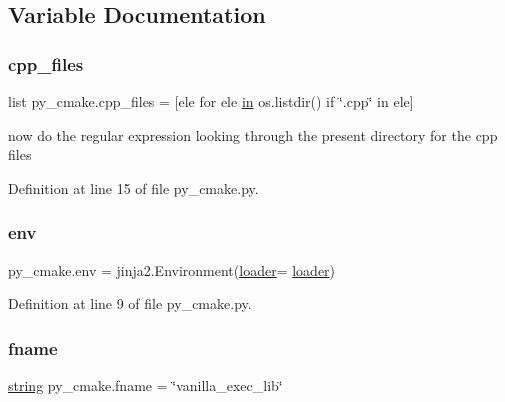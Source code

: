 \subsection{Variable Documentation}
\mbox{\label{namespacepy__cmake_a2adfb240dd9e470e11d95645a68c30e9}} 
\subsubsection{\texorpdfstring{cpp\+\_\+files}{cpp\_files}}
{\footnotesize\ttfamily list py\+\_\+cmake.\+cpp\+\_\+files = \mbox{[}ele for ele \mbox{\hyperlink{glad_8h_a83ad0ee7f1e06b59c90271716e689080}{in}} os.\+listdir() if \char`\"{}.cpp\char`\"{} in ele\mbox{]}}



now do the regular expression looking through the present directory for the cpp files 



Definition at line 15 of file py\+\_\+cmake.\+py.

\mbox{\label{namespacepy__cmake_a80080b0f64acfa3a823fad76e05499bf}} 
\subsubsection{\texorpdfstring{env}{env}}
{\footnotesize\ttfamily py\+\_\+cmake.\+env = jinja2.\+Environment(\mbox{\hyperlink{namespacepy__cmake_a84a25d33eb535db93c795c9b431ad3e4}{loader}}= \mbox{\hyperlink{namespacepy__cmake_a84a25d33eb535db93c795c9b431ad3e4}{loader}})}



Definition at line 9 of file py\+\_\+cmake.\+py.

\mbox{\label{namespacepy__cmake_a384351d048ae243fa2f2f419db26f3ad}} 
\subsubsection{\texorpdfstring{fname}{fname}}
{\footnotesize\ttfamily \mbox{\hyperlink{glad_8h_ae84541b4f3d8e1ea24ec0f466a8c568b}{string}} py\+\_\+cmake.\+fname = \char`\"{}vanilla\+\_\+exec\+\_\+lib\char`\"{}}



